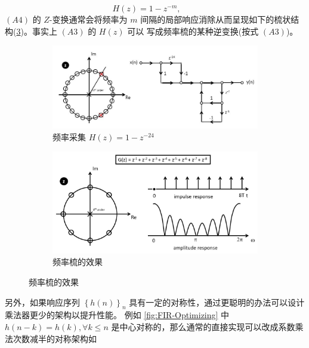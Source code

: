 \begin{equation*}
    H(z) = 1 - z^{-m},\qquad \tag{A4}
\end{equation*}
$(A4)$ 的 $Z$-变换通常会将频率为 $m$ 间隔的局部响应消除从而呈现如下的梳状结构(\ref{fig:FIR-Comb})。事实上 $(A3)$ 的 $H(z)$ 可以
写成频率梳的某种逆变换(按式 $(A3)$)。
\begin{center}
    \begin{figure}[ht!]
        \begin{subfigure}{\textwidth}
            \centering
            \includegraphics[scale=0.4]{figures/FIR_Frequency.jpg}
            \caption{频率采集 $H(z) = 1-z^{-24}$}
            \label{fig:FIR-Frequency}
        \end{subfigure}
        \hfill
        \begin{subfigure}{\textwidth}
            \centering
            \includegraphics[scale=0.4]{figures/FIR_Comb.jpg}
            \caption{频率梳的效果}
            \label{fig:FIR-Comb}
        \end{subfigure}
    \end{figure}
\end{center}
另外，如果响应序列 $\left\{h(n)\right\}_{n}$ 具有一定的对称性，通过更聪明的办法可以设计乘法器更少的架构以提升性能。
例如 \ref{fig:FIR-Optimizing} 中 $h(n-k) = h(k),\forall k\le n$ 是中心对称的，那么通常的直接实现可以改成系数乘法次数减半的对称架构如
